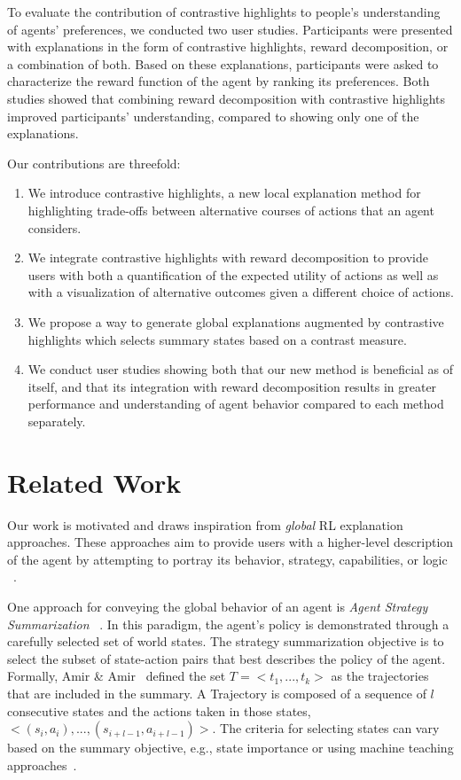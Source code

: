 \documentclass{ecai}
\begin{document}
To evaluate the contribution of contrastive highlights to people's understanding of agents' preferences, we conducted two user studies. Participants were presented with explanations in the form of contrastive highlights, reward decomposition, or a combination of both. Based on these explanations, participants were asked to characterize the reward function of the agent by ranking its preferences. Both studies showed that combining reward decomposition with contrastive highlights improved participants' understanding, compared to showing only one of the explanations. 

Our contributions are threefold: 
\begin{enumerate}
\item We introduce contrastive highlights, a new local explanation method for highlighting trade-offs between alternative courses of actions that an agent considers. 

\item We integrate contrastive highlights with reward decomposition to provide users with both a quantification of the expected utility of actions as well as with a visualization of alternative outcomes given a different choice of actions.

\item We propose a way to generate global explanations augmented by contrastive highlights which selects summary states based on a contrast measure.

\item We conduct user studies showing both that our new method is beneficial as of itself, and that its integration with reward decomposition results in greater performance and understanding of agent behavior compared to each method separately.
\end{enumerate}

\section{Related Work}
Our work is motivated and draws inspiration from \emph{global} RL explanation approaches. These approaches aim to provide users with a higher-level description of the agent by attempting to portray its behavior, strategy, capabilities, or logic ~\cite{huang2019enabling,amir2019summarizing,booth2019evaluating}. 

One approach for conveying the global behavior of an agent is \emph{Agent Strategy Summarization} ~\cite{amir2019summarizing}. In this paradigm, the agent's policy is demonstrated through a carefully selected set of world states. The strategy summarization objective is to select the subset of state-action pairs that best describes the policy of the agent. Formally, Amir \& Amir~\cite{amir2018highlights} defined the set $T= <t_1,...,t_k>$ as the trajectories that are included in the summary. A Trajectory is composed of a sequence of $l$ consecutive states and the actions taken in those states, $<(s_i,a_i),...,(s_{i+l-1},a_{i+l-1})>$. 
The criteria for selecting states can vary based on the summary objective, e.g., state importance \cite{amir2018highlights,sequeira2020interestingness,huber2021local} or using machine teaching approaches~\cite{lage2019exploring,huang2019enabling}.
\end{document}
